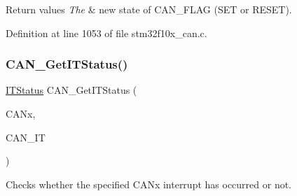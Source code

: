 \begin{DoxyRetVals}{Return values}
{\em The} & new state of C\+A\+N\+\_\+\+F\+L\+AG (S\+ET or R\+E\+S\+ET). \\
\hline
\end{DoxyRetVals}


Definition at line 1053 of file stm32f10x\+\_\+can.\+c.

\mbox{\label{group___c_a_n___private___functions_ga9aca05b3013e1b3438f3559f80b33c82}} 
\subsubsection{\texorpdfstring{C\+A\+N\+\_\+\+Get\+I\+T\+Status()}{CAN\_GetITStatus()}}
{\footnotesize\ttfamily \hyperlink{group___exported__types_gaacbd7ed539db0aacd973a0f6eca34074}{I\+T\+Status} C\+A\+N\+\_\+\+Get\+I\+T\+Status (\begin{DoxyParamCaption}\item[{\hyperlink{struct_c_a_n___type_def}{C\+A\+N\+\_\+\+Type\+Def} $\ast$}]{C\+A\+Nx,  }\item[{uint32\+\_\+t}]{C\+A\+N\+\_\+\+IT }\end{DoxyParamCaption})}



Checks whether the specified C\+A\+Nx interrupt has occurred or not. 


